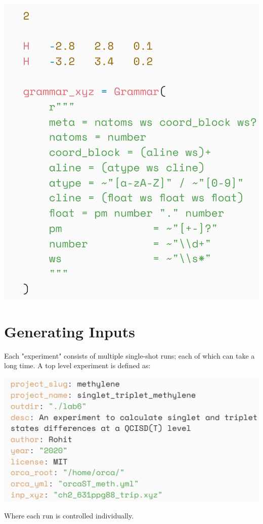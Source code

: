 \documentclass[a0paper,fleqn]{betterposter}
\begin{document}
{\includegraphics[width=\textwidth]{img/grammar_xyz.png}
\section{Generating Inputs}
Each "experiment" consists of multiple
single-shot runs; each of which can take a long time. A top level experiment is defined as:

\includegraphics[width=\textwidth]{img/exampleExp.png}

Where each run is controlled individually.

}
\end{document}
